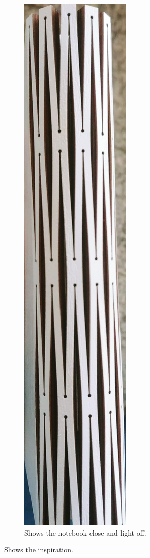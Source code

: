 \documentclass[04_projectProcess.tex]{subfiles}
\begin{document}
\begin{flushleft}
\begin{figure}[H]
\begin{subfigure}{.45\textwidth}
                    \includegraphics[scale=0.03, angle=90]{images/projectideas/inspiration_off.jpg}
                    \caption{Shows the notebook close and light off.}
                    \label{fig:inspirationLightOff}
                    \vspace{6mm}
                \end{subfigure}
                \caption{Shows the inspiration.}
                \label{fig:inspiration}
            \end{figure}
        \end{flushleft}
\end{document}
